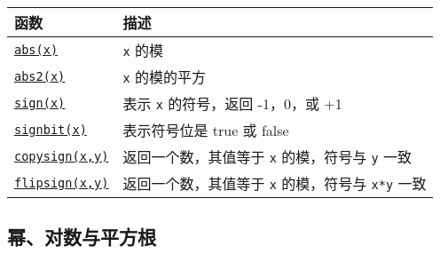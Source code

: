 \begin{table}[h]

\begin{tabulary}{\linewidth}{|L|L|}
\hline
函数 & 描述 \\
\hline
\hyperlink{9614495866226399167}{\texttt{abs(x)}} & \texttt{x} 的模 \\
\hline
\hyperlink{15686257922156163743}{\texttt{abs2(x)}} & \texttt{x} 的模的平方 \\
\hline
\hyperlink{14349105033929355161}{\texttt{sign(x)}} & 表示 \texttt{x} 的符号，返回 -1，0，或 +1 \\
\hline
\hyperlink{9457038569823603490}{\texttt{signbit(x)}} & 表示符号位是 true 或 false \\
\hline
\hyperlink{6024566200716053110}{\texttt{copysign(x,y)}} & 返回一个数，其值等于 \texttt{x} 的模，符号与 \texttt{y} 一致 \\
\hline
\hyperlink{2689022981470151558}{\texttt{flipsign(x,y)}} & 返回一个数，其值等于 \texttt{x} 的模，符号与 \texttt{x*y} 一致 \\
\hline
\end{tabulary}

\end{table}



\hypertarget{15750140405864720482}{}


\subsection{幂、对数与平方根}




